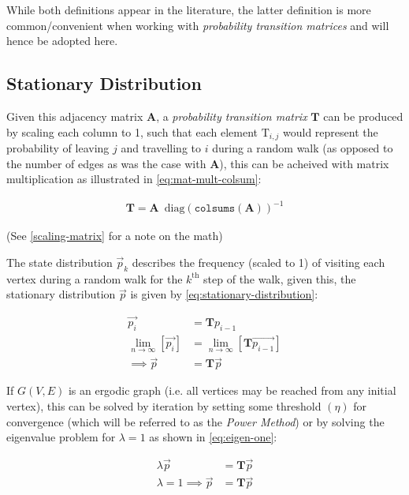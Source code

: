 \documentclass[11pt]{article}
\begin{document}
While both definitions appear in the literature, the latter definition is more
common/convenient when working with \emph{probability transition matrices} and will
hence be adopted here.
\subsection{Stationary Distribution}
\label{stationary-distribution}
Given this adjacency matrix \(\mathbf{A}\), a \emph{probability transition matrix}
\(\mathbf{T}\) can be produced by scaling each column to 1, such that each element
\(\mathrm{T}_{i, j}\) would represent the probability of leaving \(j\) and
travelling to \(i\) during a random walk (as opposed to the number of edges as was
the case with \(\mathbf{A}\)), this can
be acheived with matrix multiplication as illustrated in
\eqref{eq:mat-mult-colsum}:

\begin{align}
\mathbf{T} = \mathbf{A} \enspace \mathrm{diag}\left( \mathtt{colsums}\left(
\mathbf{A} \right) \right)^{-1} \label{eq:mat-mult-colsum} \end{align}


(See \textsection \ref{scaling-matrix} for a note on the math)

The state distribution \(\vec{p}_{k}\) describes the frequency (scaled to 1) of
visiting each vertex during a random walk for the \(k^{\textrm{th}}\) step of the
walk, given this, the stationary distribution \(\vec{p}\) is given by
\eqref{eq:stationary-distribution}:


\begin{align}
\vec{p_{i}} &= \mathbf{T} p_{i-1} \nonumber \\ \lim_{n \to \infty} \left[
\vec{p_{i}} \right] &= \lim_{n \to \infty} \left[ \mathbf{T} \vec{p_{i-1}}
\right] \nonumber \\ \implies \vec{p} &= \mathbf{T} \vec{p}
\label{eq:stationary-distribution} \end{align}

If \(G(V, E)\) is an ergodic graph (i.e. all vertices may be reached from any
initial vertex), this can be solved by iteration by setting some threshold
\((\eta)\) for convergence (which will be referred to as the \emph{Power Method}) or by
solving the eigenvalue problem for \(\lambda=1\) as shown in \eqref{eq:eigen-one}:

\begin{align}
\lambda \vec{p} &= \mathbf{T} \vec{p} \nonumber \\ \lambda = 1 \implies \vec{p}
&= \mathbf{T} \vec{p} \label{eq:eigen-one} \end{align}
\end{document}
